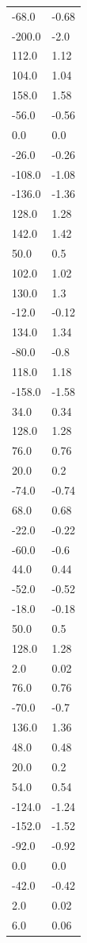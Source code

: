 \begin{longtable}{ll}
-68.0 & -0.68 \\
-200.0 & -2.0 \\
112.0 & 1.12 \\
104.0 & 1.04 \\
158.0 & 1.58 \\
-56.0 & -0.56 \\
0.0 & 0.0 \\
-26.0 & -0.26 \\
-108.0 & -1.08 \\
-136.0 & -1.36 \\
128.0 & 1.28 \\
142.0 & 1.42 \\
50.0 & 0.5 \\
102.0 & 1.02 \\
130.0 & 1.3 \\
-12.0 & -0.12 \\
134.0 & 1.34 \\
-80.0 & -0.8 \\
118.0 & 1.18 \\
-158.0 & -1.58 \\
34.0 & 0.34 \\
128.0 & 1.28 \\
76.0 & 0.76 \\
20.0 & 0.2 \\
-74.0 & -0.74 \\
68.0 & 0.68 \\
-22.0 & -0.22 \\
-60.0 & -0.6 \\
44.0 & 0.44 \\
-52.0 & -0.52 \\
-18.0 & -0.18 \\
50.0 & 0.5 \\
128.0 & 1.28 \\
2.0 & 0.02 \\
76.0 & 0.76 \\
-70.0 & -0.7 \\
136.0 & 1.36 \\
48.0 & 0.48 \\
20.0 & 0.2 \\
54.0 & 0.54 \\
-124.0 & -1.24 \\
-152.0 & -1.52 \\
-92.0 & -0.92 \\
0.0 & 0.0 \\
-42.0 & -0.42 \\
2.0 & 0.02 \\
6.0 & 0.06 \\

\end{longtable}
